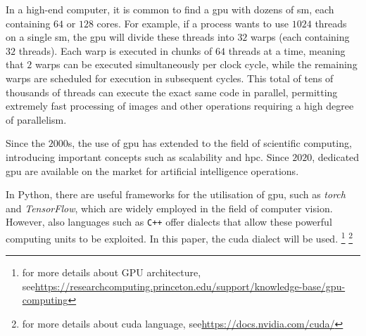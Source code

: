 \noindent In a high-end computer, it is common to find a \gls{gpu} with dozens of \gls{sm}, each containing $64$ or $128$ \gls{core}s. For example, if a process wants to use $\num{1024}$ threads on a single \gls{sm}, the \gls{gpu} will divide these threads into $32$ warps (each containing $32$ threads). Each warp is executed in chunks of $64$ threads at a time, meaning that $2$ warps can be executed simultaneously per clock cycle, while the remaining warps are scheduled for execution in subsequent cycles. This total of tens of thousands of \gls{thread}s can execute the exact same code in parallel, permitting extremely fast processing of images and other operations requiring a high degree of parallelism.

\noindent Since the $2000$s, the use of \gls{gpu} has extended to the field of scientific computing, introducing important concepts such as scalability and \gls{hpc}. Since $2020$, dedicated \gls{gpu} are available on the market for artificial intelligence operations.

\noindent In \gls{Python}, there are useful frameworks for the utilisation of \gls{gpu}, such as \textit{torch} and \textit{TensorFlow}, which are widely employed in the field of computer vision. However, also languages such as \verb "C++" offer dialects that allow these powerful computing units to be exploited. In this paper, the \gls{cuda} dialect will be used.
\footnote{for more details about GPU architecture, see\newline\url{https://researchcomputing.princeton.edu/support/knowledge-base/gpu-computing}}
\footnote{for more details about \gls{cuda} language, see\newline\url{https://docs.nvidia.com/cuda/}}

